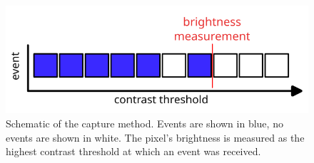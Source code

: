 \begin{figure}
    \centering
    \includegraphics[width=.9\textwidth]{chapters/papers/ED/resources/plots/intensity-estimation/scanning.png}
    \caption{Schematic of the capture method. Events are shown in blue, no events are shown in white. The pixel's brightness is measured as the highest contrast threshold at which an event was received.}
    \label{fig:scanning}
\end{figure}